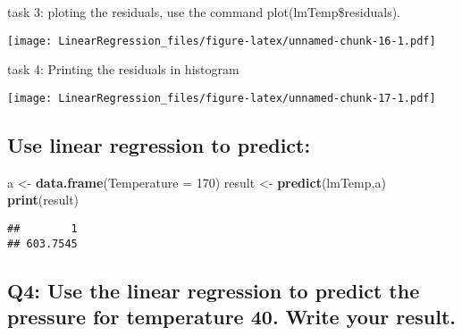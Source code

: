 \documentclass[
]{article}
\newenvironment{Shaded}{\begin{snugshade}}{\end{snugshade}}
\newcommand{\AttributeTok}[1]{\textcolor[rgb]{0.13,0.29,0.53}{#1}}
\newcommand{\DecValTok}[1]{\textcolor[rgb]{0.00,0.00,0.81}{#1}}
\newcommand{\FunctionTok}[1]{\textcolor[rgb]{0.13,0.29,0.53}{\textbf{#1}}}
\newcommand{\NormalTok}[1]{#1}
\newcommand{\OtherTok}[1]{\textcolor[rgb]{0.56,0.35,0.01}{#1}}
\newcommand{\SpecialCharTok}[1]{\textcolor[rgb]{0.81,0.36,0.00}{\textbf{#1}}}
\newcommand{\StringTok}[1]{\textcolor[rgb]{0.31,0.60,0.02}{#1}}
\begin{document}
task 3: ploting the residuals, use the command plot(lmTemp\$residuals).

\begin{Shaded}
\end{Shaded}

\texttt{[image: LinearRegression\_files/figure-latex/unnamed-chunk-16-1.pdf]}

task 4: Printing the residuals in histogram

\begin{Shaded}
\end{Shaded}

\texttt{[image: LinearRegression\_files/figure-latex/unnamed-chunk-17-1.pdf]}

\hypertarget{use-linear-regression-to-predict}{%
\subsection{Use linear regression to
predict:}\label{use-linear-regression-to-predict}}

\begin{Shaded}
\begin{Highlighting}[]
\NormalTok{a }\OtherTok{\textless{}{-}} \FunctionTok{data.frame}\NormalTok{(}\AttributeTok{Temperature =} \DecValTok{170}\NormalTok{) }
\NormalTok{result }\OtherTok{\textless{}{-}} \FunctionTok{predict}\NormalTok{(lmTemp,a) }
\FunctionTok{print}\NormalTok{(result) }
\end{Highlighting}
\end{Shaded}

\begin{verbatim}
##        1 
## 603.7545
\end{verbatim}

\hypertarget{q4-use-the-linear-regression-to-predict-the-pressure-for-temperature-40.-write-your-result.}{%
\subsection{Q4: Use the linear regression to predict the pressure for
temperature 40. Write your
result.}\label{q4-use-the-linear-regression-to-predict-the-pressure-for-temperature-40.-write-your-result.}}
\end{document}
